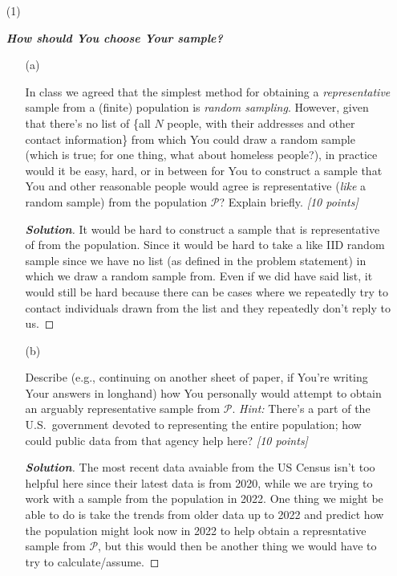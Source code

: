\documentclass[12pt]{article}
\newenvironment{solution}{\begin{proof}[\textbf{\textit{Solution}}] }{\end{proof}}
\begin{document}
\begin{itemize}
\item[(1)]

\textbf{\textit{How should You choose Your sample?}}

\begin{itemize}

\item[(a)]

In class we agreed that the simplest method for obtaining a \textit{representative} sample from a (finite) population is \textit{random sampling}. However, given that there's no list of \{all $N$ people, with their addresses and other contact information\} from which You could draw a random sample (which is true; for one thing, what about homeless people?), in practice would it be easy, hard, or in between for You to construct a sample that You and other reasonable people would agree is representative (\textit{like} a random sample) from the population $\mathcal{ P }$? Explain briefly. \textit{[10 points]} 
\begin{tcolorbox}
    \begin{solution}
        It would be hard to construct a sample that is representative of from the population. Since it would be hard to take a like IID random sample since we have no list (as defined in the problem statement) in which we draw a random sample from. Even if we did have said list, it would still be hard because there can be cases where we repeatedly try to contact individuals drawn from the list and they repeatedly don't reply to us.  
    \end{solution}
\end{tcolorbox}


\vspace*{1.0in}

\item[(b)]

Describe (e.g., continuing on another sheet of paper, if You're writing Your answers in longhand) how You personally would attempt to obtain an arguably representative sample from $\mathcal{ P }$. \textit{Hint:} There's a part of the U.S.~government devoted to representing the entire population; how could public data from that agency help here? \textit{[10 points]}
\begin{tcolorbox}
    \begin{solution}
        The most recent data avaiable from the US Census isn't too helpful here since their latest data is from 2020, while we are trying to work with a sample from the population in 2022. One thing we might be able to do is take the trends from older data up to 2022 and predict how the population might look now in 2022 to help obtain a represntative sample from $\mathcal{P}$, but this would then be another thing we would have to try to calculate/assume. 
    \end{solution}
\end{tcolorbox}
\end{itemize}

\vspace*{0.8in}

\end{itemize}
\end{document}
